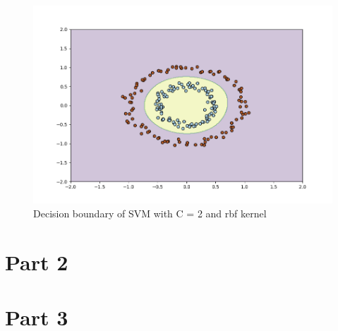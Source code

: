 \documentclass[12pt,a4paper, margin=1in]{article}
\begin{document}
\begin{figure}
    \centering
    \includegraphics[scale=0.75]{svm-rbf-2}
    \caption{Decision boundary of SVM with C = 2 and rbf kernel}
\end{figure}


\section{Part 2}


\section{Part 3}
\end{document}

